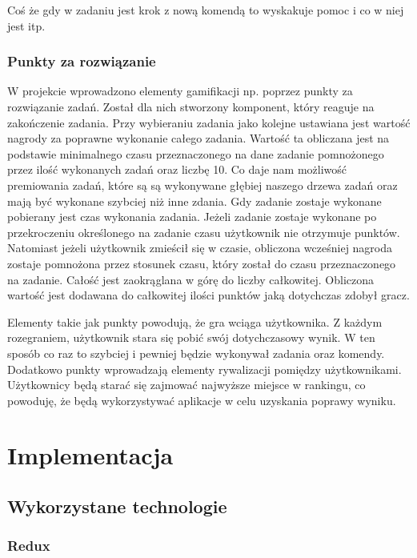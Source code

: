 \documentclass[11pt,a4paper,polish,thesis]{dcsbook}
\begin{document}
	Coś że gdy w zadaniu jest krok z nową komendą to wyskakuje pomoc i co w niej jest itp.
	
	\subsection{Punkty za rozwiązanie}
	
	W projekcie wprowadzono elementy gamifikacji np. poprzez punkty za rozwiązanie zadań. Został dla nich stworzony komponent, który reaguje na zakończenie zadania. Przy wybieraniu zadania jako kolejne ustawiana jest wartość nagrody za poprawne wykonanie całego zadania. Wartość ta obliczana jest na podstawie minimalnego czasu przeznaczonego na dane zadanie pomnożonego przez ilość wykonanych zadań oraz liczbę 10. Co daje nam możliwość premiowania zadań, które są są wykonywane głębiej naszego drzewa zadań oraz mają być wykonane szybciej niż inne zdania. Gdy zadanie zostaje wykonane pobierany jest czas wykonania zadania. Jeżeli zadanie zostaje wykonane po przekroczeniu określonego na zadanie czasu użytkownik nie otrzymuje punktów. Natomiast jeżeli użytkownik zmieścił się w czasie, obliczona wcześniej nagroda zostaje pomnożona przez stosunek czasu, który został do czasu przeznaczonego na zadanie. Całość jest zaokrąglana w górę do liczby całkowitej. Obliczona wartość jest dodawana do całkowitej ilości punktów jaką dotychczas zdobył gracz. 


	Elementy takie jak punkty powodują, że gra wciąga użytkownika. Z każdym rozegraniem, użytkownik stara się pobić swój dotychczasowy wynik. W ten sposób co raz to szybciej i pewniej będzie wykonywał zadania oraz komendy. Dodatkowo punkty wprowadzają elementy rywalizacji pomiędzy użytkownikami. Użytkownicy będą starać się zajmować najwyższe miejsce w rankingu, co powoduję, że będą wykorzystywać aplikacje w celu uzyskania poprawy wyniku. 

	
	
	\chapter{Implementacja}
	
	\section{Wykorzystane technologie}
	
	\subsection{Redux}
	
\end{document}
